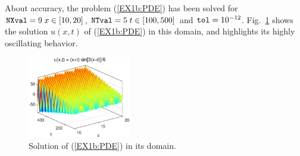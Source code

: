 \documentclass[a4paper,10pt]{report}%
\begin{document}
About accuracy, the problem (\ref{EX1b:PDE}) has been solved for ${\tt NXval}=9\; x\in[10,20]$,
${\tt NTval}=5\; t\in[100,500]$ and ${\tt tol}=10^{-12}$.
Fig.~\ref{EX1b_SURF} shows the solution $u(x,t)$ of (\ref{EX1b:PDE}) in this domain, and highlights its highly
oscillating behavior.
\begin{figure}[htb]
\centering
\includegraphics[width=0.4\textwidth]{./FIGS/EX1b/ex1b_uxt.eps}
\caption{\small Solution of (\ref{EX1b:PDE}) in its domain.}
\label{EX1b_SURF}
\end{figure}
\end{document}

